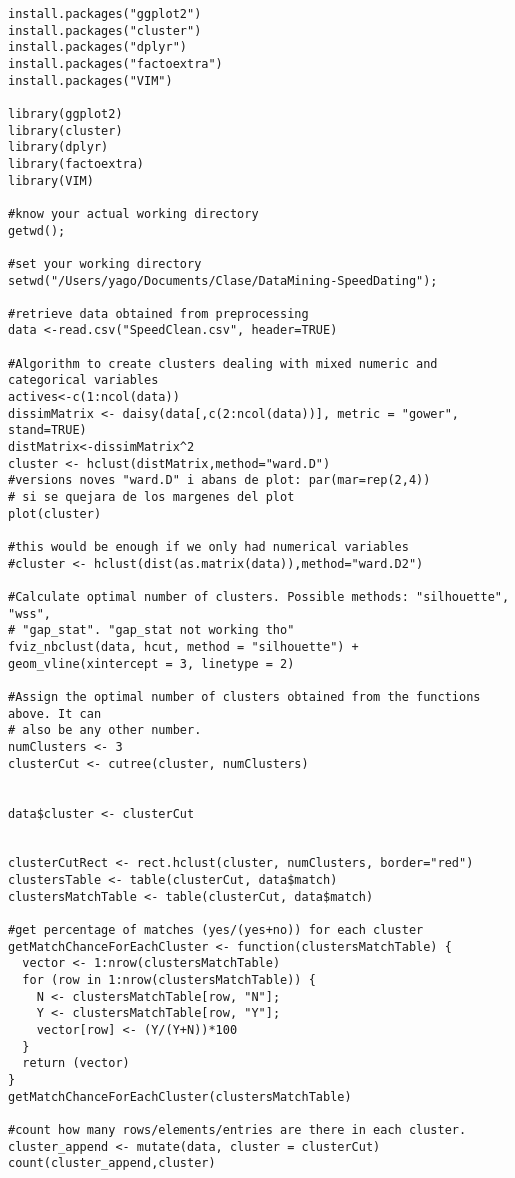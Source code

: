 \begin{verbatim}
install.packages("ggplot2")
install.packages("cluster")
install.packages("dplyr")
install.packages("factoextra")
install.packages("VIM")

library(ggplot2)
library(cluster)
library(dplyr)
library(factoextra)
library(VIM)

#know your actual working directory
getwd();

#set your working directory
setwd("/Users/yago/Documents/Clase/DataMining-SpeedDating");

#retrieve data obtained from preprocessing
data <-read.csv("SpeedClean.csv", header=TRUE)

#Algorithm to create clusters dealing with mixed numeric and categorical variables
actives<-c(1:ncol(data))
dissimMatrix <- daisy(data[,c(2:ncol(data))], metric = "gower", stand=TRUE)
distMatrix<-dissimMatrix^2
cluster <- hclust(distMatrix,method="ward.D")
#versions noves "ward.D" i abans de plot: par(mar=rep(2,4))
# si se quejara de los margenes del plot
plot(cluster)

#this would be enough if we only had numerical variables
#cluster <- hclust(dist(as.matrix(data)),method="ward.D2")

#Calculate optimal number of clusters. Possible methods: "silhouette", "wss", 
# "gap_stat". "gap_stat not working tho"
fviz_nbclust(data, hcut, method = "silhouette") +
geom_vline(xintercept = 3, linetype = 2)

#Assign the optimal number of clusters obtained from the functions above. It can 
# also be any other number.
numClusters <- 3
clusterCut <- cutree(cluster, numClusters)


data$cluster <- clusterCut


clusterCutRect <- rect.hclust(cluster, numClusters, border="red") 
clustersTable <- table(clusterCut, data$match)
clustersMatchTable <- table(clusterCut, data$match)

#get percentage of matches (yes/(yes+no)) for each cluster
getMatchChanceForEachCluster <- function(clustersMatchTable) {
  vector <- 1:nrow(clustersMatchTable)
  for (row in 1:nrow(clustersMatchTable)) {
    N <- clustersMatchTable[row, "N"];
    Y <- clustersMatchTable[row, "Y"];
    vector[row] <- (Y/(Y+N))*100
  }
  return (vector)
}
getMatchChanceForEachCluster(clustersMatchTable)

#count how many rows/elements/entries are there in each cluster.
cluster_append <- mutate(data, cluster = clusterCut)
count(cluster_append,cluster)

\end{verbatim}

